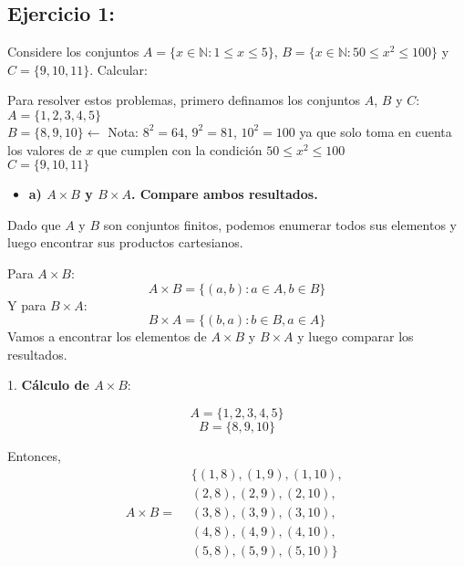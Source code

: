 \documentclass{templateNote}
\begin{document}

\portada

\margenes %

\subsection*{\textbf{Ejercicio 1}:} 
Considere los conjuntos $A = \{x \in \mathbb{N}: 1 \leq x \leq 5\}$, $B = \{x \in \mathbb{N}: 50 \leq x^{2} \leq 100\}$
y $C = \{9,10,11\}$. Calcular: 


Para resolver estos problemas, primero definamos los conjuntos $A$, $B$ y $C$: \\
$A=\{1,2,3,4,5\}$ \\
$B=\{8,9,10\} \leftarrow$ Nota: $8^{2}=64$, $9^{2}=81$, $10^{2}=100$ ya que solo toma en cuenta los valores de $x$ que cumplen con la condición $50 \leq x^{2} \leq 100$ \\
$C=\{9,10,11\}$

\begin{itemize}
    \item \textbf{a) $A \times B$ y $B \times A$. Compare ambos resultados.}
\end{itemize}

Dado que \( A \) y \( B \) son conjuntos finitos, podemos enumerar todos sus elementos y luego encontrar sus productos cartesianos.

Para \( A \times B \):
\[ A \times B = \{(a, b) : a \in A, b \in B\} \]
Y para \( B \times A \):
\[ B \times A = \{(b, a) : b \in B, a \in A\} \]
Vamos a encontrar los elementos de \( A \times B \) y \( B \times A \) y luego comparar los resultados.

1. \textbf{Cálculo de \( A \times B \)}:

\[ A = \{1, 2, 3, 4, 5\} \]
\[ B = \{8, 9, 10\} \]

Entonces,
\[ A \times B = \begin{aligned}
    &\{(1, 8), (1, 9), (1, 10), \\
    &(2, 8), (2, 9), (2, 10), \\
    &(3, 8), (3, 9), (3, 10), \\
    &(4, 8), (4, 9), (4, 10), \\
    &(5, 8), (5, 9), (5, 10)\}
    \end{aligned} \]
    
\end{document}
